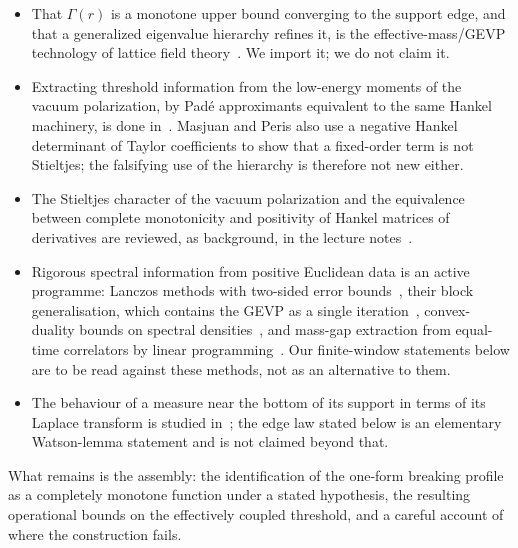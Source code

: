 \documentclass[11pt]{article}
\theoremstyle{definition}
\theoremstyle{remark}
\begin{document}
\begin{itemize}
      not claim it. Deriving the Euclidean representation from the Wightman
      axioms also rests on measure-theoretic lemmas and a continuation that we
      have not checked against primary sources.
\item That $\Gamma(r)$ is a monotone upper bound converging to the support
      edge, and that a generalized eigenvalue hierarchy refines it, is the
      effective-mass/GEVP technology of lattice field
      theory~\cite{luscher_wolff_1990,blossier_et_al_gevp_2009}. We import it;
      we do not claim it.
\item Extracting threshold information from the low-energy moments of the
      vacuum polarization, by Pad\'e approximants equivalent to the same
      Hankel machinery, is done in~\cite{masjuan_peris_2009,
      bakergravesmorris1996pade}. Masjuan and Peris also use a negative Hankel
      determinant of Taylor coefficients to show that a fixed-order term is
      not Stieltjes; the falsifying use of the hierarchy is therefore not new
      either.
\item The Stieltjes character of the vacuum polarization and the
      equivalence between complete monotonicity and positivity of Hankel
      matrices of derivatives are reviewed, as background, in the lecture
      notes~\cite{raman_2026_positivity_notes}.
\item Rigorous spectral information from positive Euclidean data is an
      active programme: Lanczos methods with two-sided error
      bounds~\cite{wagman_2025_lanczos}, their block generalisation, which
      contains the GEVP as a single iteration~\cite{hackett_wagman_2025_block_lanczos},
      convex-duality bounds on spectral densities~\cite{lawrence_2024_lagrange_duality},
      and mass-gap extraction from equal-time correlators by linear
      programming~\cite{mutzel_tilloy_2025}. Our finite-window statements
      below are to be read against these methods, not as an alternative to
      them.
\item The behaviour of a measure near the bottom of its support in terms of
      its Laplace transform is studied in~\cite{hinrichs_polzer_2025}; the
      edge law stated below is an elementary Watson-lemma statement and is
      not claimed beyond that.
\end{itemize}
What remains is the assembly: the identification of the one-form breaking
profile as a completely monotone function under a stated hypothesis, the
resulting operational bounds on the effectively coupled threshold, and a careful account of
where the construction fails.
\end{document}
